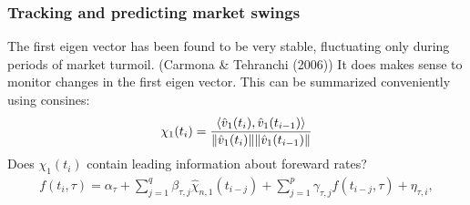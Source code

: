 \documentclass[fleqn]{beamer}
\begin{document}
\begin{frame}
  \frametitle{Tracking and predicting market swings}
  The first eigen vector has been found to be very stable, fluctuating only during periods of market turmoil. (Carmona \& Tehranchi (2006)) It does makes sense to monitor changes in the first eigen vector. This can be summarized conveniently using consines:
  \begin{align}
    \chi_1(t_i) = \frac{\langle \hat{v}_1(t_i), \hat{v}_1(t_{i-1})\rangle}{\Vert \hat{v}_1(t_i)\Vert \Vert \hat{v}_1(t_{i-1})\Vert}\notag
    \label{}
  \end{align}
 Does  $\chi_1(t_i)$ contain leading information about foreward rates?
\begin{align}
  f(t_i, \tau) = \alpha_{\tau} + \sum_{j=1}^q\beta_{\tau,j} \hat{\chi}_{n,1} (t_{i-j}) + \sum_{j=1}^p\gamma_{\tau,j} f(t_{i-j},\tau)+ \eta_{\tau,i},
  \label{}
\end{align}
\end{frame}
\end{document}
